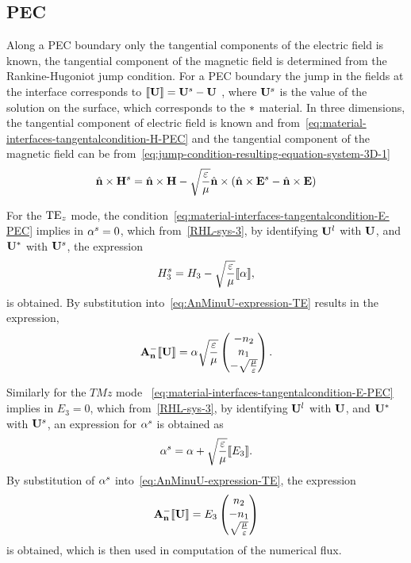 \subsection{PEC}
Along a PEC boundary only the tangential components of the electric field is known, the tangential component of the magnetic field is determined from the Rankine-Hugoniot jump condition. For a PEC boundary the jump in the fields at the interface corresponds to $\llbracket \mathbf{U} \rrbracket = \mathbf{U}^s - \mathbf{U}$ , where $\mathbf{U}^s$ is the value of the solution on the surface, which corresponds to the $*$ material. In three dimensions, the tangential component of electric field is known and from~\eqref{eq:material-interfaces-tangentalcondition-H-PEC} and the tangential component of the magnetic field can be from~\eqref{eq:jump-condition-resulting-equation-system-3D-1} 
\begin{align}
  \hat{\mathbf{n}} \times \mathbf{H}^s = \hat{\mathbf{n}} \times \mathbf{H} - \sqrt{\frac{\varepsilon}{\mu}} \hat{\mathbf{n}} \times \left( \hat{\mathbf{n}} \times \mathbf{E}^s - \hat{\mathbf{n}} \times \mathbf{E} \right)
\end{align}

For the $\textrm{TE}_{z}$ mode, the condition~\eqref{eq:material-interfaces-tangentalcondition-E-PEC} implies in $ \alpha^s = 0 $, which from~\eqref{RHL-sys-3}, by identifying $\mathbf{U}^l$ with $\mathbf{U}$, and $\mathbf{U}^*$ with $\mathbf{U}^s$, the expression
\begin{equation*}
H_3^s 
  =  H_3
- \sqrt{\frac{\varepsilon}{\mu}} \llbracket  \alpha \rrbracket,
\end{equation*}
is obtained. By substitution into~\eqref{eq:AnMinuU-expression-TE} results in the expression,
$$
\mathbf{A}_\mathbf{n}^{-} \llbracket \mathbf{U} \rrbracket =
\alpha
\sqrt{\frac{\varepsilon}{\mu}}
\begin{pmatrix}
 - n_2 \\
n_1 \\
- \sqrt{\frac{\mu}{\varepsilon} }
\end{pmatrix}
.
$$

Similarly for the $TMz$ mode ~\eqref{eq:material-interfaces-tangentalcondition-E-PEC} implies in $ E_3 = 0$, which from~\eqref{RHL-sys-3}, by identifying $\mathbf{U}^l$ with $\mathbf{U}$, and $\mathbf{U}^*$ with $\mathbf{U}^s$, an expression for $\alpha^s$ is obtained as
\begin{equation*}
\alpha^s 
  =  \alpha
+ \sqrt{\frac{\varepsilon}{\mu}} \llbracket  E_3 \rrbracket
.
\end{equation*}
By substitution of $\alpha^s$ into~\eqref{eq:AnMinuU-expression-TE}, the expression
$$
\mathbf{A}_\mathbf{n}^{-} \llbracket \mathbf{U} \rrbracket =
E_3
\begin{pmatrix}
n_2 \\
- n_1 \\
\sqrt{\frac{\mu}{\varepsilon} }
\end{pmatrix}
$$
is obtained, which is then used in computation of the numerical flux.

